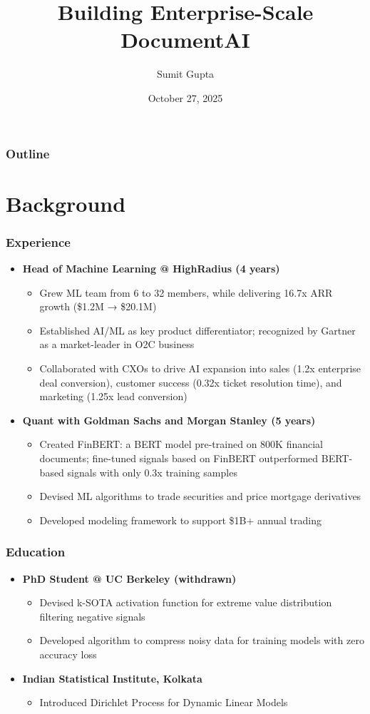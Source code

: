 \documentclass{beamer}
\title{Building Enterprise-Scale DocumentAI}
\author{Sumit Gupta}
\date{October 27, 2025}
\begin{document}
\frame{\titlepage}

\begin{frame}
\frametitle{Outline}
\tableofcontents
\end{frame}

\section{Background}

\begin{frame}
\frametitle{Experience}
\begin{itemize}
    \item \textbf{Head of Machine Learning @ HighRadius (4 years)}
    \begin{itemize}
        \item Grew ML team from 6 to 32 members, while delivering 16.7x ARR growth (\$1.2M → \$20.1M)
        \item Established AI/ML as key product differentiator; recognized by Gartner as a market-leader in O2C business
        \item Collaborated with CXOs to drive AI expansion into sales (1.2x enterprise deal conversion), customer success (0.32x ticket resolution time), and marketing (1.25x lead conversion)
    \end{itemize}
    \item \textbf{Quant with Goldman Sachs and Morgan Stanley (5 years)}
    \begin{itemize}
        \item Created FinBERT: a BERT model pre-trained on 800K financial documents; fine-tuned signals based on FinBERT outperformed BERT-based signals with only 0.3x training samples
        \item Devised ML algorithms to trade securities and price mortgage derivatives
        \item Developed modeling framework to support \$1B+ annual trading
    \end{itemize}
\end{itemize}
\end{frame}

\begin{frame}
\frametitle{Education}
\begin{itemize}
    \item \textbf{PhD Student @ UC Berkeley (withdrawn)}
    \begin{itemize}
        \item Devised k-SOTA activation function for extreme value distribution filtering negative signals
        \item Developed algorithm to compress noisy data for training models with zero accuracy loss
    \end{itemize}
    \item \textbf{Indian Statistical Institute, Kolkata}
    \begin{itemize}
        \item Introduced Dirichlet Process for Dynamic Linear Models
    \end{itemize}
\end{itemize}
\end{frame}
\end{document}
